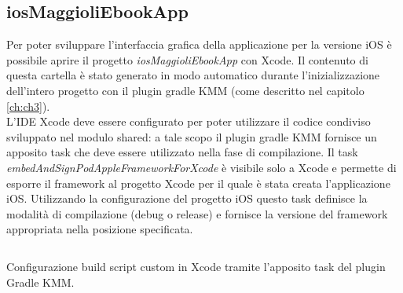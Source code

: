 \subsection{iosMaggioliEbookApp}

Per poter sviluppare l'interfaccia grafica della applicazione per la versione iOS è possibile aprire il progetto \textit{iosMaggioliEbookApp} con Xcode. Il contenuto di questa cartella è stato generato in modo automatico durante l'inizializzazione dell'intero progetto con il plugin gradle KMM (come descritto nel capitolo \ref{ch:ch3}).\\
L'IDE Xcode deve essere configurato per poter utilizzare il codice condiviso sviluppato nel modulo shared: a tale scopo il plugin gradle KMM fornisce un apposito task che deve essere utilizzato nella fase di compilazione. Il task \textit{embedAndSignPodAppleFrameworkForXcode} è visibile solo a Xcode e permette di esporre il framework al progetto Xcode per il quale è stata creata l'applicazione iOS. Utilizzando la configurazione del progetto iOS questo task definisce la modalità di compilazione (debug o release) e fornisce la versione del framework appropriata nella posizione specificata.

\begin{listing}[H]
\inputminted{bash}{code/5-xcodeconfigkmm}
\caption{Configurazione build script custom in Xcode tramite l'apposito task del plugin Gradle KMM.}
\end{listing}

